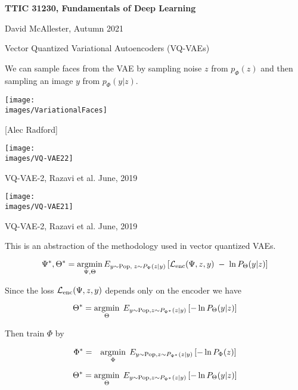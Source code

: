 





{\Huge

  \centerline{\bf TTIC 31230, Fundamentals of Deep Learning}
  \bigskip
  \centerline{David McAllester, Autumn 2021}
  \vfill
  \vfil
  \centerline{Vector Quantized Variational Autoencoders (VQ-VAEs)}
  \vfill
  \vfill


We can sample faces from the VAE by sampling noise $z$ from $p_\Phi(z)$ and then sampling an image $y$ from $p_\Phi(y|z)$.

\vfill
\centerline{\texttt{[image: \\images/VariationalFaces]}}
\centerline{[Alec Radford]}


\centerline{\texttt{[image: \\images/VQ-VAE22]}}

\vfill
VQ-VAE-2, Razavi et al. June, 2019


\centerline{\texttt{[image: \\images/VQ-VAE21]}}

\vfill
VQ-VAE-2, Razavi et al. June, 2019



{\huge
This is an abstraction of the methodology used in vector quantized VAEs.

$$\Psi^*,\Theta^* = \operatorname*{argmin}_{\Psi,\Theta} E_{y \sim \mathrm{Pop},\;z \sim P_\Psi(z|y)}\left[{\cal L}_{\mathrm{enc}}(\Psi,z,y) \;-\;\ln P_\Theta(y|z)\right]$$

\vfill
Since the loss ${\cal L}_{\mathrm{enc}}(\Psi,z,y)$ depends only on the encoder we have

$$\Theta^* = \operatorname*{argmin}_\Theta\;E_{y \sim \mathrm{Pop},z \sim P_{\Psi^*}(z|y)}\left[-\ln P_\Theta(y|z)\right]$$

Then train $\Phi$ by

\begin{eqnarray*}
\Phi^* &  = & \operatorname*{argmin}_{\Phi}\;E_{y\sim \mathrm{Pop},z\sim P_{\Psi^*}(z|y)}\left[-\ln P_\Phi(z)\right]
\end{eqnarray*}
}



{\huge

$$\Theta^* = \operatorname*{argmin}_\Theta\;E_{y \sim \mathrm{Pop},z \sim P_{\Psi^*}(z|y)}\left[-\ln P_\Theta(y|z)\right]$$

}}
